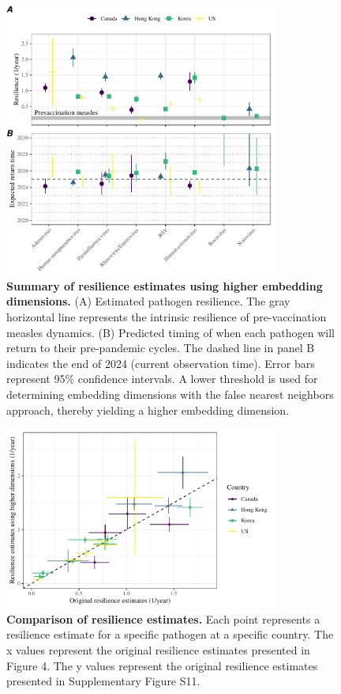 \documentclass[12pt]{article}
\begin{document}
\begin{figure}[!th]
\begin{center}
\includegraphics[width=0.8\textwidth]{../figure4_th/figure4_th.pdf}
\caption{
\textbf{Summary of resilience estimates using higher embedding dimensions.}
(A) Estimated pathogen resilience.
The gray horizontal line represents the intrinsic resilience of pre-vaccination measles dynamics.
(B) Predicted timing of when each pathogen will return to their pre-pandemic cycles.
The dashed line in panel B indicates the end of 2024 (current observation time).
Error bars represent 95\% confidence intervals.
A lower threshold is used for determining embedding dimensions with the false nearest neighbors approach, thereby yielding a higher embedding dimension.
}
\end{center}
\end{figure}

\pagebreak

\begin{figure}[!th]
\begin{center}
\includegraphics[width=0.8\textwidth]{../figure4_th/figure4_comparison.pdf}
\caption{
\textbf{Comparison of resilience estimates.}
Each point represents a resilience estimate for a specific pathogen at a specific country.
The x values represent the original resilience estimates presented in Figure 4.
The y values represent the original resilience estimates presented in Supplementary Figure S11.
}
\end{center}
\end{figure}

\pagebreak



\end{document}
